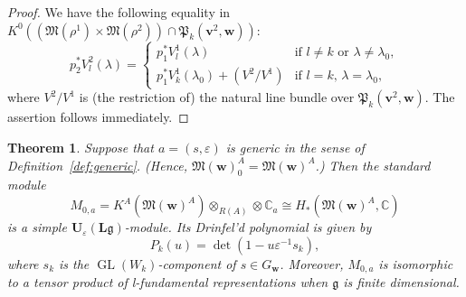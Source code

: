 \documentclass[12pt]{amsart}
\def\Bbb{\mathbb}
\def\frak{\mathfrak}
\newcommand{\rom}{\textup}
\newtheorem{Theorem}[equation]{Theorem}
\theoremstyle{definition}
\theoremstyle{remark}
\numberwithin{equation}{subsection}
\newcommand{\defref}[1]{Definition~\ref{#1}}
\newcommand{\C}{{\Bbb C}}
\newcommand{\GL}{\operatorname{GL}}
\newcommand{\M}{{\frak M}} %
\newcommand{\bv}{{\mathbf v}} %
\newcommand{\bw}{{\mathbf w}} %
\newcommand{\Ule}{{\mathbf U}_{\varepsilon}({\mathbf L}\mathfrak g)}
\newcommand{\Pa}{{\frak P}} %
\newcommand{\Mw}{\M(\bw)}
\begin{document}
\begin{proof}
We have the following equality in
$K^0((\M(\rho^1)\times\M(\rho^2))\cap \Pa_k(\bv^2,\bw))$:
\begin{equation*}
   p_2^* V^2_l(\lambda) = 
   \begin{cases}
      p_1^* V^1_l(\lambda)
        & \text{if $l\neq k$ or $\lambda \neq \lambda_0$}, \\
      p_1^* V^1_k(\lambda_0) + (V^2/V^1)
        & \text{if $l = k$, $\lambda = \lambda_0$},
   \end{cases}
\end{equation*}
where $V^2/V^1$ is (the restriction of) the natural line bundle over
$\Pa_k(\bv^2,\bw)$. The assertion follows immediately.
\end{proof}

\begin{Theorem}\label{thm:generic}
Suppose that $a = (s,\varepsilon)$ is generic in the sense of
\defref{def:generic}. \rom(Hence, 
$\Mw_0^A = \Mw^A$.\rom)
Then the standard module
\begin{equation*}
   M_{0,a} = K^A(\Mw^A)\otimes_{R(A)}\otimes\C_a
   \cong H_*(\Mw^A,\C)
\end{equation*}
is a simple $\Ule$-module. Its Drinfel'd polynomial is given by
\begin{equation*}
   P_k(u) = \det( 1 - u\varepsilon^{-1}s_k),
\end{equation*}
where $s_k$ is the $\GL(W_k)$-component of $s\in G_\bw$.
%
Moreover, $M_{0,a}$ is isomorphic to a tensor product of
{\it l\/}-fundamental representations when $\mathfrak g$ is finite
dimensional.
\end{Theorem}
\end{document}
